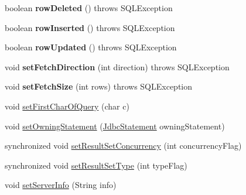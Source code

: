 \begin{DoxyCompactItemize}
boolean {\bfseries row\+Deleted} ()  throws S\+Q\+L\+Exception 
\item 
\mbox{\label{classcom_1_1mysql_1_1cj_1_1jdbc_1_1result_1_1_result_set_impl_abc8b8d728914c02e4cb318bb22337b86}} 
boolean {\bfseries row\+Inserted} ()  throws S\+Q\+L\+Exception 
\item 
\mbox{\label{classcom_1_1mysql_1_1cj_1_1jdbc_1_1result_1_1_result_set_impl_a63e03522c57129ed9646cb416d935eb6}} 
boolean {\bfseries row\+Updated} ()  throws S\+Q\+L\+Exception 
\item 
\mbox{\label{classcom_1_1mysql_1_1cj_1_1jdbc_1_1result_1_1_result_set_impl_a3ea6ca3a110b6384ef81a997164ca5a1}} 
void {\bfseries set\+Fetch\+Direction} (int direction)  throws S\+Q\+L\+Exception 
\item 
\mbox{\label{classcom_1_1mysql_1_1cj_1_1jdbc_1_1result_1_1_result_set_impl_ab7cf97503b10e2179ed8a80917f04fb5}} 
void {\bfseries set\+Fetch\+Size} (int rows)  throws S\+Q\+L\+Exception 
\item 
void \mbox{\hyperlink{classcom_1_1mysql_1_1cj_1_1jdbc_1_1result_1_1_result_set_impl_ac9fac0fdfce19c2d4a1cb5ff55e03ec5}{set\+First\+Char\+Of\+Query}} (char c)
\item 
void \mbox{\hyperlink{classcom_1_1mysql_1_1cj_1_1jdbc_1_1result_1_1_result_set_impl_a057575337f0438e794595d47b68f5f8a}{set\+Owning\+Statement}} (\mbox{\hyperlink{interfacecom_1_1mysql_1_1cj_1_1jdbc_1_1_jdbc_statement}{Jdbc\+Statement}} owning\+Statement)
\item 
synchronized void \mbox{\hyperlink{classcom_1_1mysql_1_1cj_1_1jdbc_1_1result_1_1_result_set_impl_aafb1818a76b4d34d294e12585fc7966b}{set\+Result\+Set\+Concurrency}} (int concurrency\+Flag)
\item 
synchronized void \mbox{\hyperlink{classcom_1_1mysql_1_1cj_1_1jdbc_1_1result_1_1_result_set_impl_a3554bbe610ac83562dc91bf6f39c7fc2}{set\+Result\+Set\+Type}} (int type\+Flag)
\item 
void \mbox{\hyperlink{classcom_1_1mysql_1_1cj_1_1jdbc_1_1result_1_1_result_set_impl_a46781e9e02b426e28b0f384e3f06eceb}{set\+Server\+Info}} (String info)
\item 

\end{DoxyCompactItemize}
